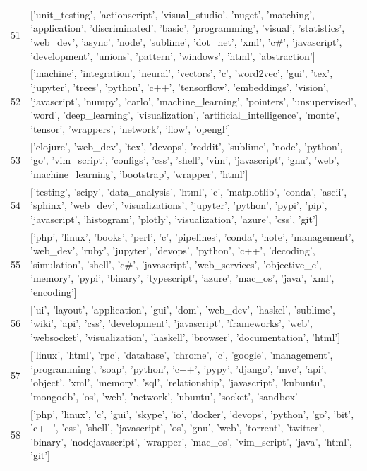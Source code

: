 \begin{center}
\begin{longtable}{|p{1.5cm}|p{12.5cm}|}
            51 & ['unit\_testing', 'actionscript', 'visual\_studio', 'nuget', 'matching', 'application', 'discriminated', 'basic', 'programming', 'visual', 'statistics', 'web\_dev', 'async', 'node', 'sublime', 'dot\_net', 'xml', 'c\#', 'javascript', 'development', 'unions', 'pattern', 'windows', 'html', 'abstraction']  \\ 
            52 & ['machine', 'integration', 'neural', 'vectors', 'c', 'word2vec', 'gui', 'tex', 'jupyter', 'trees', 'python', 'c++', 'tensorflow', 'embeddings', 'vision', 'javascript', 'numpy', 'carlo', 'machine\_learning', 'pointers', 'unsupervised', 'word', 'deep\_learning', 'visualization', 'artificial\_intelligence', 'monte', 'tensor', 'wrappers', 'network', 'flow', 'opengl']  \\ 
            53 & ['clojure', 'web\_dev', 'tex', 'devops', 'reddit', 'sublime', 'node', 'python', 'go', 'vim\_script', 'configs', 'css', 'shell', 'vim', 'javascript', 'gnu', 'web', 'machine\_learning', 'bootstrap', 'wrapper', 'html']  \\ 
            54 & ['testing', 'scipy', 'data\_analysis', 'html', 'c', 'matplotlib', 'conda', 'ascii', 'sphinx', 'web\_dev', 'visualizations', 'jupyter', 'python', 'pypi', 'pip', 'javascript', 'histogram', 'plotly', 'visualization', 'azure', 'css', 'git']  \\ 
            55 & ['php', 'linux', 'books', 'perl', 'c', 'pipelines', 'conda', 'note', 'management', 'web\_dev', 'ruby', 'jupyter', 'devops', 'python', 'c++', 'decoding', 'simulation', 'shell', 'c\#', 'javascript', 'web\_services', 'objective\_c', 'memory', 'pypi', 'binary', 'typescript', 'azure', 'mac\_os', 'java', 'xml', 'encoding']  \\ 
            56 & ['ui', 'layout', 'application', 'gui', 'dom', 'web\_dev', 'haskel', 'sublime', 'wiki', 'api', 'css', 'development', 'javascript', 'frameworks', 'web', 'websocket', 'visualization', 'haskell', 'browser', 'documentation', 'html']  \\ 
            57 & ['linux', 'html', 'rpc', 'database', 'chrome', 'c', 'google', 'management', 'programming', 'soap', 'python', 'c++', 'pypy', 'django', 'mvc', 'api', 'object', 'xml', 'memory', 'sql', 'relationship', 'javascript', 'kubuntu', 'mongodb', 'os', 'web', 'network', 'ubuntu', 'socket', 'sandbox']  \\ 
            58 & ['php', 'linux', 'c', 'gui', 'skype', 'io', 'docker', 'devops', 'python', 'go', 'bit', 'c++', 'css', 'shell', 'javascript', 'os', 'gnu', 'web', 'torrent', 'twitter', 'binary', 'nodejavascript', 'wrapper', 'mac\_os', 'vim\_script', 'java', 'html', 'git']  \\ 

\end{longtable}
\end{center}
